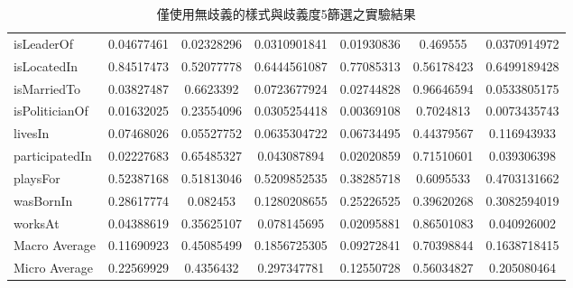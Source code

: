 \begin{sidewaystable}
\begin{center}
\begin{tabular}{|l||c|c|c||c|c|c|}
        isLeaderOf & 0.04677461 & 0.02328296 & 0.0310901841 & 0.01930836 & 0.469555 & 0.0370914972\\
        isLocatedIn & 0.84517473 & 0.52077778 & 0.6444561087 & 0.77085313 & 0.56178423 & 0.6499189428\\
        isMarriedTo & 0.03827487 & 0.6623392 & 0.0723677924 & 0.02744828 & 0.96646594 & 0.0533805175\\
        isPoliticianOf & 0.01632025 & 0.23554096 & 0.0305254418 & 0.00369108 & 0.7024813 & 0.0073435743\\
        livesIn & 0.07468026 & 0.05527752 & 0.0635304722 & 0.06734495 & 0.44379567 & 0.116943933\\
        participatedIn & 0.02227683 & 0.65485327 & 0.043087894 & 0.02020859 & 0.71510601 & 0.039306398\\
        playsFor & 0.52387168 & 0.51813046 & 0.5209852535 & 0.38285718 & 0.6095533 & 0.4703131662\\
        wasBornIn & 0.28617774 & 0.082453 & 0.1280208655 & 0.25226525 & 0.39620268 & 0.3082594019\\
        worksAt & 0.04388619 & 0.35625107 & 0.078145695 & 0.02095881 & 0.86501083 & 0.040926002\\
        \hline
        Macro Average & 0.11690923 & 0.45085499 & 0.1856725305 & 0.09272841 & 0.70398844 & 0.1638718415\\
        Micro Average & 0.22569929 & 0.4356432 & 0.297347781 & 0.12550728 & 0.56034827 & 0.205080464\\
        \hline
        \end{tabular}
        \caption{僅使用無歧義的樣式與歧義度5篩選之實驗結果}
        \label{t:baseline-1}
    \end{center}
\end{sidewaystable}
